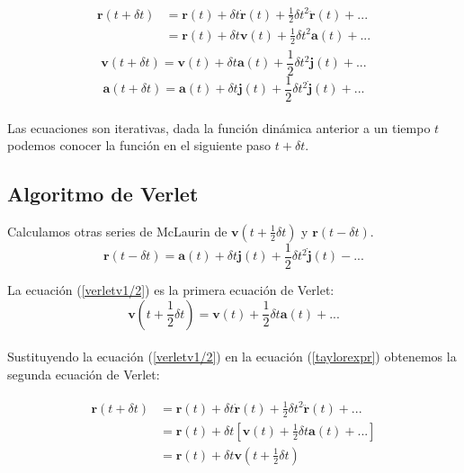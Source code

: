 \begin{align} \label{taylorexpr}
\begin{split}
    \mathbf{r}(t + \delta t) &= \mathbf{r}(t)+\delta t\dot{\mathbf{r}}(t) + \frac{1}{2}\delta t^2 \ddot{\mathbf{r}}(t)+...\\
                             &= \mathbf{r}(t)+\delta t\mathbf{v}(t) + \frac{1}{2}\delta t^2 \mathbf{a}(t)+...
\end{split}
\end{align}
\begin{equation}\label{taylorexpv}
    \mathbf{v}(t + \delta t) = \mathbf{v}(t)+\delta t\mathbf{a}(t) + \frac{1}{2}\delta t^2 \mathbf{j}(t)+...
\end{equation}
\begin{equation}\label{taylorexpa}
    \mathbf{a}(t + \delta t) = \mathbf{a}(t)+\delta t\mathbf{j}(t) + \frac{1}{2}\delta t^2 \dot{\mathbf{j}}(t)+...
\end{equation}\\

Las ecuaciones son iterativas, dada la función dinámica anterior a un tiempo $t$ podemos conocer la función en el siguiente paso $t + \delta t$.

\subsection{Algoritmo de Verlet}

Calculamos otras series de McLaurin de $\mathbf{v}(t+\frac{1}{2}\delta t)$ y $\mathbf{r}(t-\delta t)$.\\

\begin{equation}\label{taylorexpr-}
    \mathbf{r}(t - \delta t) = \mathbf{a}(t)+\delta t\mathbf{j}(t) + \frac{1}{2}\delta t^2 \mathbf{\dot{j}}(t)-...
\end{equation}

La ecuación (\ref{verletv1/2}) es la primera ecuación de Verlet:\\
\begin{equation}\label{verletv1/2}
    \mathbf{v}(t + \frac{1}{2}\delta t) = \mathbf{v}(t)+\frac{1}{2}\delta t\mathbf{a}(t) +...
\end{equation}\\

Sustituyendo la ecuación (\ref{verletv1/2}) en la ecuación (\ref{taylorexpr}) obtenemos la segunda ecuación de Verlet:

\begin{align} \label{verletr}
\begin{split}
    \mathbf{r}(t + \delta t) &= \mathbf{r}(t)+\delta t\dot{\mathbf{r}}(t) + \frac{1}{2}\delta t^2 \ddot{\mathbf{r}}(t)+...\\
                             &= \mathbf{r}(t)+\delta t\left[\mathbf{v}(t) + \frac{1}{2}\delta t \mathbf{a}(t)+...\right]\\
                             &= \mathbf{r}(t)+\delta t \mathbf{v}(t+\frac{1}{2}\delta t)
\end{split}
\end{align}

